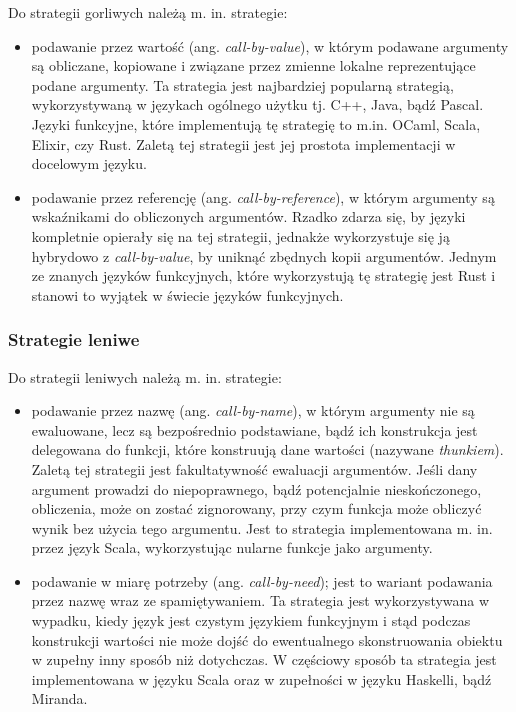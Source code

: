 \documentclass[../praca.tex]{subfiles}
\begin{document}
Do strategii gorliwych należą m. in. strategie:
\begin{itemize}
  \item podawanie przez wartość (ang. \emph{call-by-value}), w którym podawane argumenty
    są obliczane, kopiowane i związane przez zmienne lokalne reprezentujące
    podane argumenty. Ta strategia jest najbardziej popularną strategią, wykorzystywaną
    w językach ogólnego użytku tj. C++, Java, bądź Pascal. Języki funkcyjne, które 
    implementują tę strategię to m.in. OCaml, Scala, Elixir, czy Rust.
    Zaletą tej strategii jest jej prostota implementacji
    w docelowym języku.
  \item podawanie przez referencję (ang. \emph{call-by-reference}), w którym
    argumenty są wskaźnikami do obliczonych argumentów. Rzadko zdarza się,
    by języki kompletnie opierały się na tej strategii, jednakże wykorzystuje
    się ją hybrydowo z \emph{call-by-value}, by uniknąć zbędnych kopii argumentów.
    Jednym ze znanych języków funkcyjnych, które wykorzystują tę strategię jest
    Rust i stanowi to wyjątek w świecie języków funkcyjnych.
\end{itemize}

\subsubsection{Strategie leniwe}

Do strategii leniwych należą m. in. strategie:
\begin{itemize}
  \item podawanie przez nazwę (ang. \emph{call-by-name}), 
    w którym argumenty nie są ewaluowane, lecz
    są bezpośrednio podstawiane, bądź ich konstrukcja jest delegowana
    do funkcji, które konstruują dane wartości (nazywane \emph{thunkiem}).
    Zaletą tej strategii jest
    fakultatywność ewaluacji argumentów. Jeśli dany argument
    prowadzi do niepoprawnego, bądź potencjalnie nieskończonego, 
    obliczenia, może on zostać zignorowany, przy
    czym funkcja może obliczyć wynik bez użycia tego argumentu.
    Jest to strategia implementowana m. in. przez język Scala, wykorzystując
    nularne funkcje jako argumenty. 
  \item podawanie w miarę potrzeby (ang. \emph{call-by-need}); jest to
    wariant podawania przez nazwę wraz ze spamiętywaniem. Ta strategia jest
    wykorzystywana w wypadku, kiedy język jest czystym językiem funkcyjnym
    i stąd podczas konstrukcji wartości nie może dojść do ewentualnego skonstruowania
    obiektu w zupełny inny sposób niż dotychczas. W częściowy sposób ta
    strategia jest implementowana w języku Scala oraz w zupełności w języku
    Haskelli, bądź Miranda.
\end{itemize}
\end{document}
